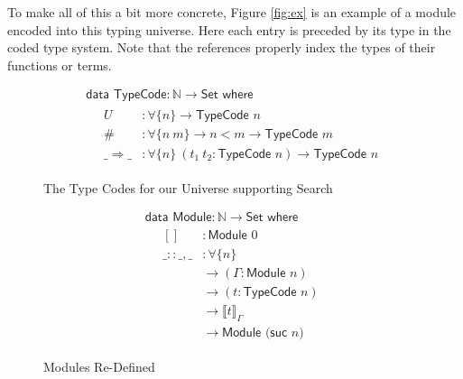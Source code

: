 \documentclass[acmsmall,review,authorversion]{acmart}
\newcommand{\type}[1]{\textsf{#1}}
\newcommand{\Set}{\type{Set}}
\newcommand{\Interp}[1]{\llbracket #1 \rrbracket}
\newcommand{\?}{\stackrel{?}{\approx}}
\newcommand{\data}[2]{\textsf{data } #1 : #2 \textsf{ where}}
\begin{document}
To make all of this a bit more concrete, Figure \ref{fig:ex} is an example of a
module encoded into this typing universe. Here each entry is preceded by its
type in the coded type system. Note that the references properly index the types
of their functions or terms.

\begin{figure}[t]
  \centering
$$  
  \begin{array}{l}
    \data{\textsf{TypeCode}}{\mathbb{N} \rightarrow \Set}\\
    \quad
    \begin{array}{ll}
      U &: \forall \{ n \} \rightarrow \textsf{TypeCode } n\\
      \# &: \forall \{ n\ m \} \rightarrow n < m \rightarrow \textsf{TypeCode } m\\
      \_\Rightarrow\_ &: \forall \{ n \}\ (t_1\ t_2 : \textsf{TypeCode } n)
                        \rightarrow \textsf{TypeCode } n
    \end{array}

  \end{array}
  $$
  \caption{The Type Codes for our Universe supporting Search}
  \label{fig:codes}
\end{figure}


\begin{figure}[b]
  $$
  \begin{array}{l}
    \data{\textsf{Module}}{\mathbb{N} \rightarrow \Set}\\
    \quad \begin{array}{ll}
            []        &: \textsf{Module } 0\\
            \_::\_,\_ &: \forall \{ n \}\\
                      &\rightarrow  (\Gamma : \textsf{Module } n)\\
                      &\rightarrow  (t : \textsf{TypeCode } n)\\
                      &\rightarrow  \Interp{ t }_\Gamma \\
                      &\rightarrow \textsf{Module (suc }  n)
          \end{array}
  \end{array}
$$
\caption{Modules Re-Defined}
\label{fig:mods}
\end{figure} 
\end{document}
